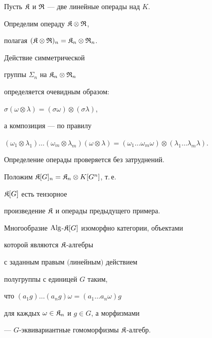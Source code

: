 \begin{exam}


Пусть $\frak K$ и $\frak R$ --- две линейные операды над $K$. 


Определим операду $\frak K\otimes \frak R$, 


полагая $(\frak K\otimes \frak R)_n=\frak K_n\otimes \frak R_n$.


Действие симметрической


группы $\Sigma_n$ на $\frak K_n\otimes \frak R_n$


определяется очевидным образом:


$\sigma(\omega\otimes \lambda)=(\sigma\omega)\otimes (\sigma\lambda)$,


а композиция --- по правилу


$(\omega_1\otimes \lambda_1)\dotsc


(\omega_m\otimes \lambda_m)(\omega\otimes \lambda)=


(\omega_1\dotsc\omega_m\omega)\otimes(\lambda_1\dotsc\lambda_m\lambda)$.


Определение операды проверяется без затруднений.


Положим $\frak K[G]_n=\frak K_n\otimes K[G^n]$, т.\,е.


$\frak K[G]$ есть тензорное


произведение $\frak K$ и операды предыдущего примера.


\end{exam}





\begin{thm}


Многообразие $\operatorname{Alg}$-$\frak K[G]$ изоморфно категории, объектами


которой являются $\frak K$-алгебры


с заданным правым $($линейным$)$ действием


полугруппы с единицей $G$ таким,


что $(a_1 g) \dotsc (a_n g)\omega= (a_1 \dotsc a_n \omega) g$


для каждых $\omega\in \frak K_n$ и $g\in G$, а морфизмами


--- $G$-эквивариантные гомоморфизмы $\frak K$-алгебр.


\end{thm}





